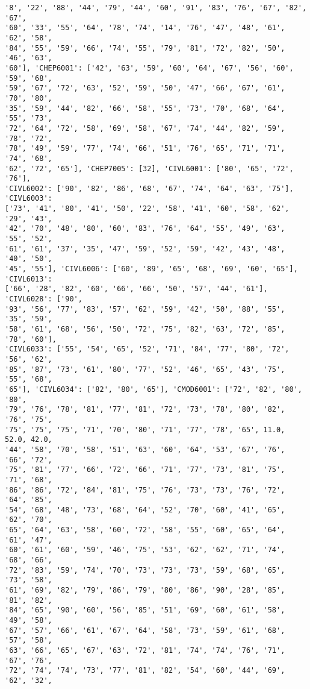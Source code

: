 \documentclass[11pt]{article}
\begin{document}
\begin{Verbatim}[commandchars=\\\{\}]
'8', '22', '88', '44', '79', '44', '60', '91', '83', '76', '67', '82', '67',
'60', '33', '55', '64', '78', '74', '14', '76', '47', '48', '61', '62', '58',
'84', '55', '59', '66', '74', '55', '79', '81', '72', '82', '50', '46', '63',
'60'], 'CHEP6001': ['42', '63', '59', '60', '64', '67', '56', '60', '59', '68',
'59', '67', '72', '63', '52', '59', '50', '47', '66', '67', '61', '70', '80',
'35', '59', '44', '82', '66', '58', '55', '73', '70', '68', '64', '55', '73',
'72', '64', '72', '58', '69', '58', '67', '74', '44', '82', '59', '78', '72',
'78', '49', '59', '77', '74', '66', '51', '76', '65', '71', '71', '74', '68',
'62', '72', '65'], 'CHEP7005': [32], 'CIVL6001': ['80', '65', '72', '76'],
'CIVL6002': ['90', '82', '86', '68', '67', '74', '64', '63', '75'], 'CIVL6003':
['73', '41', '80', '41', '50', '22', '58', '41', '60', '58', '62', '29', '43',
'42', '70', '48', '80', '60', '83', '76', '64', '55', '49', '63', '55', '52',
'61', '61', '37', '35', '47', '59', '52', '59', '42', '43', '48', '40', '50',
'45', '55'], 'CIVL6006': ['60', '89', '65', '68', '69', '60', '65'], 'CIVL6013':
['66', '28', '82', '60', '66', '66', '50', '57', '44', '61'], 'CIVL6028': ['90',
'93', '56', '77', '83', '57', '62', '59', '42', '50', '88', '55', '35', '59',
'58', '61', '68', '56', '50', '72', '75', '82', '63', '72', '85', '78', '60'],
'CIVL6033': ['55', '54', '65', '52', '71', '84', '77', '80', '72', '56', '62',
'85', '87', '73', '61', '80', '77', '52', '46', '65', '43', '75', '55', '68',
'65'], 'CIVL6034': ['82', '80', '65'], 'CMOD6001': ['72', '82', '80', '80',
'79', '76', '78', '81', '77', '81', '72', '73', '78', '80', '82', '76', '75',
'75', '75', '75', '71', '70', '80', '71', '77', '78', '65', 11.0, 52.0, 42.0,
'44', '58', '70', '58', '51', '63', '60', '64', '53', '67', '76', '66', '72',
'75', '81', '77', '66', '72', '66', '71', '77', '73', '81', '75', '71', '68',
'86', '86', '72', '84', '81', '75', '76', '73', '73', '76', '72', '64', '85',
'54', '68', '48', '73', '68', '64', '52', '70', '60', '41', '65', '62', '70',
'65', '64', '63', '58', '60', '72', '58', '55', '60', '65', '64', '61', '47',
'60', '61', '60', '59', '46', '75', '53', '62', '62', '71', '74', '68', '66',
'72', '83', '59', '74', '70', '73', '73', '73', '59', '68', '65', '73', '58',
'61', '69', '82', '79', '86', '79', '80', '86', '90', '28', '85', '81', '82',
'84', '65', '90', '60', '56', '85', '51', '69', '60', '61', '58', '49', '58',
'67', '57', '66', '61', '67', '64', '58', '73', '59', '61', '68', '57', '58',
'63', '66', '65', '67', '63', '72', '81', '74', '74', '76', '71', '67', '76',
'72', '74', '74', '73', '77', '81', '82', '54', '60', '44', '69', '62', '32',

\end{Verbatim}
\end{document}
